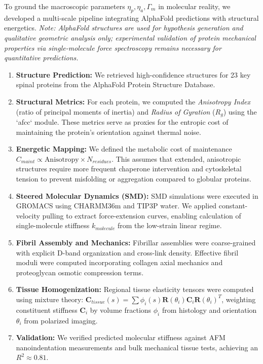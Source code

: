 To ground the macroscopic parameters $\eta_p, \eta_a, \Gamma_m$ in molecular reality, we developed a multi-scale pipeline integrating AlphaFold predictions with structural energetics. \textit{Note: AlphaFold structures are used for hypothesis generation and qualitative geometric analysis only; experimental validation of protein mechanical properties via single-molecule force spectroscopy remains necessary for quantitative predictions.}
\begin{enumerate}
    \item \textbf{Structure Prediction:} We retrieved high-confidence structures for 23 key spinal proteins from the AlphaFold Protein Structure Database.
    \item \textbf{Structural Metrics:} For each protein, we computed the \emph{Anisotropy Index} (ratio of principal moments of inertia) and \emph{Radius of Gyration} ($R_g$) using the `afcc` module. These metrics serve as proxies for the entropic cost of maintaining the protein's orientation against thermal noise.
    \item \textbf{Energetic Mapping:} We defined the metabolic cost of maintenance $C_{maint} \propto \text{Anisotropy} \times N_{residues}$. This assumes that extended, anisotropic structures require more frequent chaperone intervention and cytoskeletal tension to prevent misfolding or aggregation compared to globular proteins.
    \item \textbf{Steered Molecular Dynamics (SMD):} SMD simulations were executed in GROMACS using CHARMM36m and TIP3P water. We applied constant-velocity pulling to extract force-extension curves, enabling calculation of single-molecule stiffness $k_{molecule}$ from the low-strain linear regime.
    \item \textbf{Fibril Assembly and Mechanics:} Fibrillar assemblies were coarse-grained with explicit D-band organization and cross-link density. Effective fibril moduli were computed incorporating collagen axial mechanics and proteoglycan osmotic compression terms.
    \item \textbf{Tissue Homogenization:} Regional tissue elasticity tensors were computed using mixture theory: $\mathbf{C}_{tissue}(s) = \sum \phi_i(s) \mathbf{R}(\theta_i) \mathbf{C}_i \mathbf{R}(\theta_i)^T$, weighting constituent stiffness $\mathbf{C}_i$ by volume fractions $\phi_i$ from histology and orientation $\theta_i$ from polarized imaging.
    \item \textbf{Validation:} We verified predicted molecular stiffness against AFM nanoindentation measurements and bulk mechanical tissue tests, achieving an $R^2 \approx 0.81$.
\end{enumerate}

